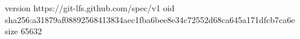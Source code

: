 version https://git-lfs.github.com/spec/v1
oid sha256:a31879af08892568413834aec1fba6bee8e34c72552d68ca645a171dfcb7ca6e
size 65632

